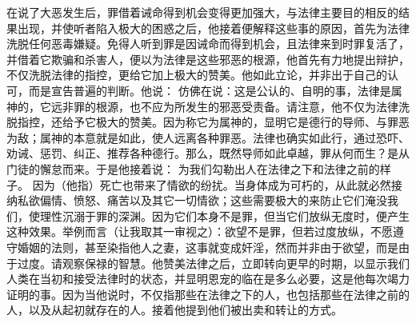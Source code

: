 \par

\par

在说了大恶发生后，罪借着诫命得到机会变得更加强大，与法律主要目的相反的结果出现，并使听者陷入极大的困惑之后，他接着便解释这些事的原因，首先为法律洗脱任何恶毒嫌疑。免得人听到罪是因诫命而得到机会，且法律来到时罪复活了，并借着它欺骗和杀害人，便以为法律是这些邪恶的根源，他首先有力地提出辩护，不仅洗脱法律的指控，更给它加上极大的赞美。他如此立论，并非出于自己的认可，而是宣告普遍的判断。他说： 仿佛在说：这是公认的、自明的事，法律是属神的，它远非罪的根源，也不应为所发生的邪恶受责备。请注意，他不仅为法律洗脱指控，还给予它极大的赞美。因为称它为属神的，显明它是德行的导师、与罪恶为敌；属神的本意就是如此，使人远离各种罪恶。法律也确实如此行，通过恐吓、劝诫、惩罚、纠正、推荐各种德行。那么，既然导师如此卓越，罪从何而生？是从门徒的懈怠而来。于是他接着说： 为我们勾勒出人在法律之下和法律之前的样子。 因为（他指）死亡也带来了情欲的纷扰。当身体成为可朽的，从此就必然接纳私欲偏情、愤怒、痛苦以及其它一切情欲；这些需要极大的来防止它们淹没我们，使理性沉溺于罪的深渊。因为它们本身不是罪，但当它们放纵无度时，便产生这种效果。举例而言（让我取其一审视之）：欲望不是罪，但若过度放纵，不愿遵守婚姻的法则，甚至染指他人之妻，这事就变成奸淫，然而并非由于欲望，而是由于过度。请观察保禄的智慧。他赞美法律之后，立即转向更早的时期，以显示我们人类在当初和接受法律时的状态，并显明恩宠的临在是多么必要，这是他每次竭力证明的事。因为当他说时，不仅指那些在法律之下的人，也包括那些在法律之前的人，以及从起初就存在的人。接着他提到他们被出卖和转让的方式。\par

 \par


